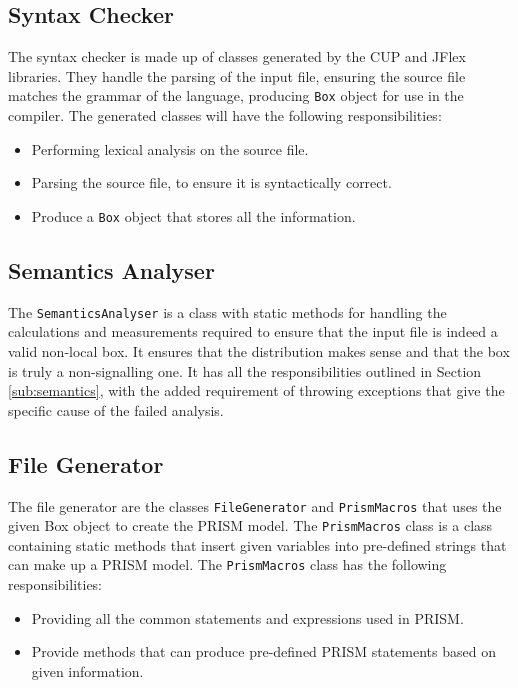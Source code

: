 \documentclass[report.tex]{subfiles}
\begin{document}
\subsection{Syntax Checker} %
\label{sub:syntax_checker}
The syntax checker is made up of classes generated by the CUP and JFlex
libraries. They handle the parsing of the input file, ensuring the source file
matches the grammar of the language, producing \texttt{Box} object for use in
the compiler. The generated classes will have the following responsibilities:
\begin{itemize}
    \item Performing lexical analysis on the source file.
    \item Parsing the source file, to ensure it is syntactically correct.
    \item Produce a \texttt{Box} object that stores all the information.
\end{itemize}

\subsection{Semantics Analyser} %
\label{sub:semantics_analyser}
The \texttt{SemanticsAnalyser} is a class with static methods for handling the
calculations and measurements required to ensure that the input file is indeed a
valid non-local box. It ensures that the distribution makes sense and that the
box is truly a non-signalling one. It has all the responsibilities outlined in
Section \ref{sub:semantics}, with the added requirement of throwing exceptions
that give the specific cause of the failed analysis.

\subsection{File Generator} %
\label{sub:file_generator}
The file generator are the classes \texttt{FileGenerator} and
\texttt{PrismMacros} that uses the given Box object to create the PRISM model.
The \texttt{PrismMacros} class is a class containing static methods that insert
given variables into pre-defined strings that can make up a PRISM model.
The \texttt{PrismMacros} class has the following responsibilities:
\begin{itemize}
    \item Providing all the common statements and expressions used in PRISM.
    \item Provide methods that can produce pre-defined PRISM statements based on
    given information.
\end{itemize}
\end{document}
